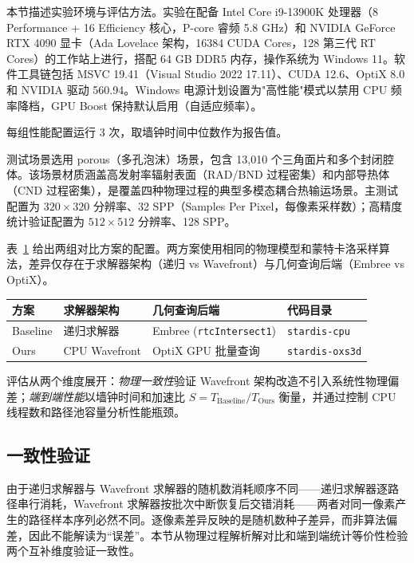 本节描述实验环境与评估方法。实验在配备 Intel Core i9-13900K 处理器（8 Performance + 16 Efficiency 核心，P-core 睿频 5.8 GHz）和 NVIDIA GeForce RTX 4090 显卡（Ada Lovelace 架构，16384 CUDA Cores，128 第三代 RT Cores）的工作站上进行，搭配 64 GB DDR5 内存，操作系统为 Windows 11。软件工具链包括 MSVC 19.41（Visual Studio 2022 17.11）、CUDA 12.6、OptiX 8.0 和 NVIDIA 驱动 560.94。Windows 电源计划设置为"高性能"模式以禁用 CPU 频率降档，GPU Boost 保持默认启用（自适应频率）。

每组性能配置运行 3 次，取墙钟时间中位数作为报告值。

测试场景选用 porous（多孔泡沫）场景，包含 13{,}010 个三角面片和多个封闭腔体。该场景材质涵盖高发射率辐射表面（RAD/BND 过程密集）和内部导热体（CND 过程密集），是覆盖四种物理过程的典型多模态耦合热输运场景。主测试配置为 $320 \times 320$ 分辨率、32 SPP（Samples Per Pixel，每像素采样数）；高精度统计验证配置为 $512 \times 512$ 分辨率、128 SPP。

表~\ref{tab:comparison-setup} 给出两组对比方案的配置。两方案使用相同的物理模型和蒙特卡洛采样算法，差异仅存在于求解器架构（递归 vs Wavefront）与几何查询后端（Embree vs OptiX）。

\begin{table}[htbp]
  \centering
  \label{tab:comparison-setup}
  \small
  \begin{tabular}{llll}
    \toprule
    方案 & 求解器架构 & 几何查询后端 & 代码目录 \\
    \midrule
    Baseline & 递归求解器 & Embree (\texttt{rtcIntersect1}) & \texttt{stardis-cpu} \\
    Ours     & CPU Wavefront & OptiX GPU 批量查询 & \texttt{stardis-oxs3d} \\
    \bottomrule
  \end{tabular}
\end{table}

评估从两个维度展开：\emph{物理一致性}验证 Wavefront 架构改造不引入系统性物理偏差；\emph{端到端性能}以墙钟时间和加速比 $S = T_{\text{Baseline}} / T_{\text{Ours}}$ 衡量，并通过控制 CPU 线程数和路径池容量分析性能瓶颈。

\subsection{一致性验证}

由于递归求解器与 Wavefront 求解器的随机数消耗顺序不同——递归求解器逐路径串行消耗，Wavefront 求解器按批次中断恢复后交错消耗——两者对同一像素产生的路径样本序列必然不同。逐像素差异反映的是随机数种子差异，而非算法偏差，因此不能解读为``误差''。本节从物理过程解析解对比和端到端统计等价性检验两个互补维度验证一致性。

